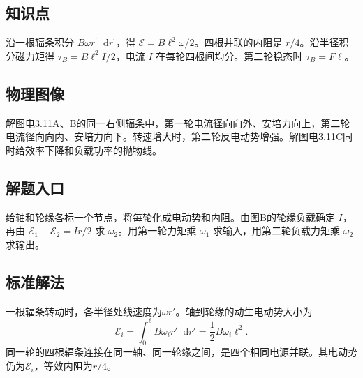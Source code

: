 \documentclass[UTF8,fontset=fandol,a4paper,11pt]{ctexart}
\newcommand{\dd}{\mathop{}\!\mathrm{d}}
\begin{document}
\subsection*{知识点}

沿一根辐条积分 $B\omega r^\prime\dd r^\prime$，得 $\mathcal E= B\ell^2\omega/2$。四根并联的内阻是 $r/4$。沿半径积分磁力矩得 $\tau_B=B\ell^2I/2$，电流 $I$ 在每轮四根间均分。第二轮稳态时 $\tau_B=F\ell$。



\subsection*{物理图像}

解图电3.11A、B的同一右侧辐条中，第一轮电流径向向外、安培力向上，第二轮电流径向向内、安培力向下。转速增大时，第二轮反电动势增强。解图电3.11C同时给效率下降和负载功率的抛物线。



\subsection*{解题入口}

给轴和轮缘各标一个节点，将每轮化成电动势和内阻。由图B的轮缘负载确定 $I$，再由 $\mathcal E_1-\mathcal E_2=I r/2$ 求 $\omega_2$。用第一轮力矩乘 $\omega_1$ 求输入，用第二轮负载力矩乘 $\omega_2$ 求输出。


\subsection*{标准解法}

一根辐条转动时，各半径处线速度为$\omega r'$。轴到轮缘的动生电动势大小为
\[
\mathcal E_i=\int_0^\ell B\omega_i r'\dd r'
=\frac12B\omega_i\ell^2.
\]
同一轮的四根辐条连接在同一轴、同一轮缘之间，是四个相同电源并联。其电动势仍为$\mathcal E_i$，等效内阻为$r/4$。
\end{document}
